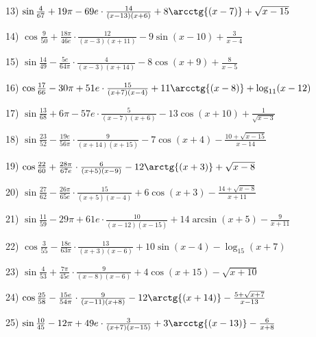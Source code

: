 \documentclass[11pt,ukrainian]{article}
\begin{document}
13) \space 
{ ${\sin\frac{4}{67}} + 19{\pi} - 69 e\cdot {\frac{14}{(x - 13)(x + 6)}} + {8\arcctg{(x - 7)}} + {\sqrt{x - 15}}$}
\smallskip\par
14) \space 
{ ${\cos\frac{9}{50}} + \frac{18{\pi}}{46 e}\cdot {\frac{12}{(x - 3)(x + 11)}} - {9\sin{(x - 10)}} + { \frac{3}{x - 4}}$}
\smallskip\par
15) \space 
{ ${\sin\frac{14}{49}} - \frac{5 e}{64{\pi}}\cdot {\frac{4}{(x - 3)(x + 14)}} - {8\cos{(x + 9)}} + { \frac{8}{x - 5}}$}
\smallskip\par
16) \space 
{ ${\cos\frac{17}{66}} - 30{\pi} + 51 e\cdot {\frac{15}{(x + 7)(x - 4)}} + {11\arcctg{(x - 8)}} + {\log_{11}(x - 12)}$}
\smallskip\par
17) \space 
{ ${\sin\frac{13}{68}} + 6{\pi} - 57 e\cdot {\frac{5}{(x - 7)(x + 6)}} - {13\cos{(x + 10)}} + {\frac{1}{\sqrt{x - 3}}}$}
\smallskip\par
18) \space 
{ ${\sin\frac{23}{52}} - \frac{19 e}{56{\pi}}\cdot {\frac{9}{(x + 14)(x + 15)}} - {7\cos{(x + 4)}} - {\frac{10 + \sqrt{x - 15}}{x - 14}}$}
\smallskip\par
19) \space 
{ ${\cos\frac{22}{60}} + \frac{28{\pi}}{67 e}\cdot {\frac{6}{(x + 5)(x - 9)}} - {12\arctg{(x + 3)}} + {\sqrt{x - 8}}$}
\smallskip\par
20) \space 
{ ${\sin\frac{27}{62}} - \frac{26{\pi}}{65 e}\cdot {\frac{15}{(x + 5)(x - 4)}} + {6\cos{(x + 3)}} - {\frac{14 + \sqrt{x - 8}}{x + 11}}$}
\smallskip\par
21) \space 
{ ${\sin\frac{11}{59}} - 29{\pi} + 61 e\cdot {\frac{10}{(x - 12)(x - 15)}} + {14\arcsin{(x + 5)}} - { \frac{9}{x + 11}}$}
\smallskip\par
22) \space 
{ ${\cos\frac{3}{55}} - \frac{18 e}{63{\pi}}\cdot {\frac{13}{(x + 3)(x - 6)}} + {10\sin{(x - 4)}} - {\log_{15}(x + 7)}$}
\smallskip\par
23) \space 
{ ${\sin\frac{4}{53}} + \frac{7{\pi}}{45 e}\cdot {\frac{9}{(x - 8)(x - 6)}} + {4\cos{(x + 15)}} - {\sqrt{x + 10}}$}
\smallskip\par
24) \space 
{ ${\cos\frac{25}{58}} - \frac{15 e}{54{\pi}}\cdot {\frac{9}{(x - 11)(x + 8)}} - {12\arctg{(x + 14)}} - {\frac{5 + \sqrt{x + 7}}{x - 13}}$}
\smallskip\par
25) \space 
{ ${\sin\frac{10}{45}} - 12{\pi} + 49 e\cdot {\frac{3}{(x + 7)(x - 15)}} + {3\arcctg{(x - 13)}} - { \frac{6}{x + 8}}$}
\smallskip\par
\end{document}
